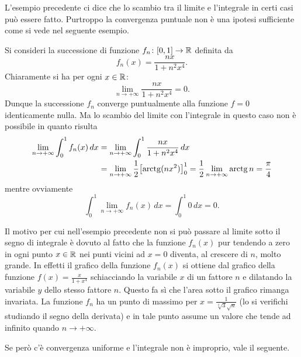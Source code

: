 L'esempio precedente ci dice che lo scambio tra il limite e l'integrale in certi casi 
può essere fatto. Purtroppo la convergenza puntuale non è una ipotesi sufficiente 
come si vede nel seguente esempio.

\begin{example}
Si consideri la successione di funzione $f_n\colon[0,1]\to{\mathbb R}$ definita da 
\[
 f_n(x) = \frac{nx}{1+n^2x^4}.  
\]
Chiaramente si ha per ogni $x\in {\mathbb R}$:
\[
  \lim_{n\to+\infty} \frac{nx}{1+n^2x^4} = 0.
\]
Dunque la successione $f_n$ converge puntualmente alla funzione $f=0$ identicamente nulla.
Ma lo scambio del limite con l'integrale in questo caso 
non è possibile in quanto risulta 
\begin{align*}
\lim_{n\to +\infty} \int_0^1 f_n(x)\, dx 
&= \lim_{n\to +\infty} \int_0^1 \frac{nx}{1+n^2x^4}\, dx \\
&=\lim_{n\to +\infty} \frac 1 2 {\left[ \operatorname{arctg}(nx^2) \right]}_0^1 
 = \frac 1 2 \lim_{n\to +\infty} \operatorname{arctg} n = \frac \pi 4 
\end{align*}
mentre ovviamente 
\[
 \int_0^1 \lim_{n\to +\infty} f_n(x)\, dx = \int_0^1 0\, dx = 0.
\]
\end{example}

Il motivo per cui nell'esempio precedente non si può passare 
al limite sotto il segno di integrale è dovuto al fatto che la funzione 
$f_n(x)$ pur tendendo a zero in ogni punto $x\in {\mathbb R}$ nei punti vicini 
ad $x=0$ diventa, al crescere di $n$, molto grande.
In effetti il grafico della funzione $f_n(x)$ si ottiene dal grafico 
della funzione $f(x) = \frac{x}{1+x^4}$ schiacciando la variabile $x$ 
di un fattore $n$ e dilatando la variabile $y$ dello stesso fattore $n$.
Questo fa sì che l'area sotto il grafico rimanga invariata.
La funzione $f_n$ ha un punto di massimo per $x=\frac{1}{\sqrt[4]3 \sqrt n}$
(lo si verifichi studiando il segno della derivata) e in tale 
punto assume un valore che tende ad infinito quando $n\to +\infty$.

Se però c'è convergenza uniforme e l'integrale non è improprio, 
vale il seguente.

